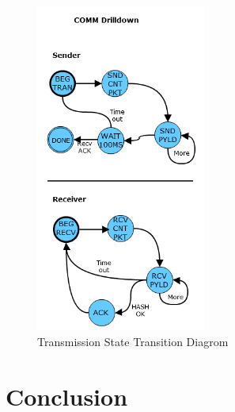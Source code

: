 \documentclass[titlepage]{article}
\begin{document}
\begin{figure}[htb]                                                                       
  \begin{center}
    \includegraphics[width=0.5\textwidth]{imgs/comm.png}
  \end{center}
  \caption{Transmission State Transition Diagrom}
  \label{fig:comm}
\end{figure}

\section{Conclusion}
\end{document}
